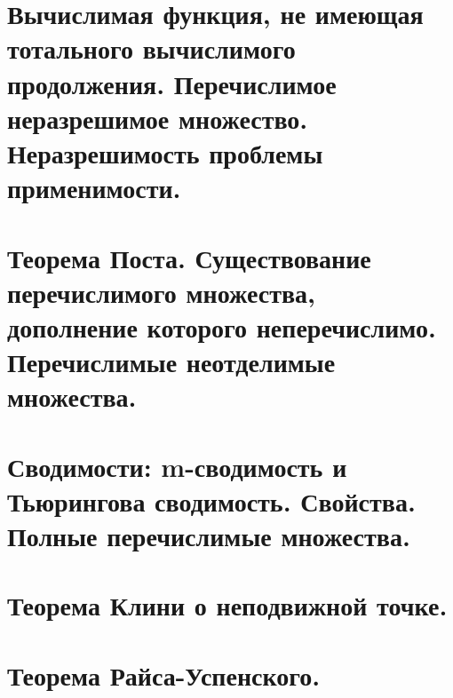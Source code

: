 \documentclass{article}
\begin{document}
    \section{Вычислимая функция, не имеющая тотального вычислимого продолжения. Перечислимое неразрешимое
    множество. Неразрешимость проблемы применимости.}

    \section{Теорема Поста. Существование перечислимого множества, дополнение которого неперечислимо.
    Перечислимые неотделимые множества.}

    \section{Сводимости: m-сводимость и Тьюрингова сводимость. Свойства. Полные перечислимые множества.}

    \section{Теорема Клини о неподвижной точке.}

    \section{Теорема Райса-Успенского.}
\end{document}
